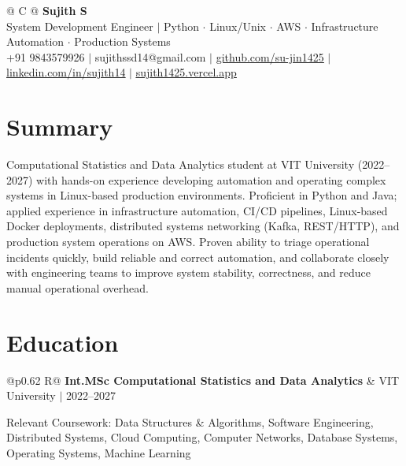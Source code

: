 \documentclass[a4paper,10pt]{article}
\newcommand{\ulink}[2]{\href{#1}{\uline{#2}}}
\newcommand{\subheading}[1]{{\color[HTML]{0A0A0A}\fontsize{12}{14}\selectfont\bfseries #1}}
\newcommand{\meta}[1]{{\color[HTML]{5C5C5C}\fontsize{10.5}{12.5}\selectfont #1}}
\begin{document}
\pagestyle{empty}

\begin{tabularx}{\linewidth}{@{} C @{}}
{\color[HTML]{000000}\fontsize{30}{35}\selectfont\bfseries Sujith S} \\[5pt]
{\fontsize{10.5}{12.5}\selectfont\color[HTML]{3A3A3A}
System Development Engineer $|$ Python $\cdot$ Linux/Unix $\cdot$ AWS $\cdot$ Infrastructure Automation $\cdot$ Production Systems} \\[6pt]
{\fontsize{10.5}{12.5}\selectfont\textcolor[HTML]{3A3A3A}{
+91 9843579926 $|$
sujithssd14@gmail.com $|$
\ulink{https://github.com/su-jin1425}{github.com/su-jin1425} $|$
\ulink{https://linkedin.com/in/sujith14}{linkedin.com/in/sujith14} $|$
\ulink{https://sujith1425.vercel.app}{sujith1425.vercel.app}}}
\end{tabularx}

\vspace{2pt}

\section{Summary}
\vspace{2pt}
{\color[HTML]{0A0A0A}\fontsize{11}{14}\selectfont
Computational Statistics and Data Analytics student at VIT University (2022--2027) with hands-on experience developing automation and operating complex systems in Linux-based production environments. Proficient in Python and Java; applied experience in infrastructure automation, CI/CD pipelines, Linux-based Docker deployments, distributed systems networking (Kafka, REST/HTTP), and production system operations on AWS. Proven ability to triage operational incidents quickly, build reliable and correct automation, and collaborate closely with engineering teams to improve system stability, correctness, and reduce manual operational overhead.}

\vspace{2pt}

\section{Education}
\vspace{2pt}

\begin{tabularx}{\linewidth}{@{}p{0.62\linewidth} R@{}}
\subheading{Int.MSc Computational Statistics and Data Analytics} & \meta{VIT University $|$ 2022--2027}
\end{tabularx}
\vspace{2pt}
{\color[HTML]{3A3A3A}\fontsize{11}{14}\selectfont Relevant Coursework: Data Structures \& Algorithms, Software Engineering, Distributed Systems, Cloud Computing, Computer Networks, Database Systems, Operating Systems, Machine Learning}
\end{document}

